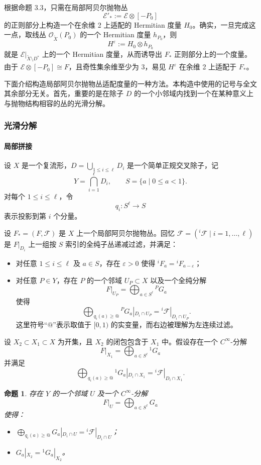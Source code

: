 \documentclass[12pt,a4paper]{article}
\newtheorem{proposition}[theorem]{命题}
\begin{document}
根据命题 3.3，只需在局部阿贝尔抛物丛
\[
\mathcal E'_*:=\mathcal E\otimes [-P_0]
\]
的正则部分上构造一个在余维 2 上适配的 Hermitian 度量 \(H_0\)。确实，一旦完成这一点，取线丛 \(\mathcal O_{\widetilde X}(P_0)\) 的一个 Hermitian 度量 \(h_{P_0}\)，则
\[
H^\varepsilon:=H_0\otimes h_{P_0}
\]
就是 \(\mathcal E|_{\widetilde X\setminus D^*}\) 上的一个 Hermitian 度量，从而诱导出 \(F_*\) 正则部分上的一个度量。由于 \(\mathcal E\otimes[-P_0]\cong F\)，且奇性集余维至少为 3，易见 \(H^\varepsilon\) 在余维 2 上适配于 \(F_*\)。

下面介绍构造局部阿贝尔抛物丛适配度量的一种方法。本构造中使用的记号与全文其余部分无关。首先，重要的是在除子 \(D\) 的一个小邻域内找到一个在某种意义上与抛物结构相容的丛的光滑分解。

\subsubsection{光滑分解}

\paragraph{局部拼接}
设 \(X\) 是一个复流形，\(D=\bigcup_{1\le i\le \ell}D_i\) 是一个简单正规交叉除子，记
\[
Y=\bigcap_{i=1}^\ell D_i,\qquad S=\{a\mid 0\le a<1\}.
\]
对每个 \(1\le i\le \ell\)，令
\[
q_i:S^\ell\to S
\]
表示投影到第 \(i\) 个分量。

设 \(F_*=(F,\mathcal F)\) 是 \(X\) 上一个局部阿贝尔抛物丛。回忆 \(\mathcal F=({}^i\mathcal F\mid i=1,\dots,\ell)\) 是 \(F|_{D_i}\) 上一组按 \(S\) 索引的全纯子丛递减过滤，并满足：
\begin{itemize}
\item 对任意 \(1\le i\le \ell\) 及 \(a\in S\)，存在 \(\varepsilon>0\) 使得 \({}^iF_a={}^iF_{a-\varepsilon}\)；
\item 对任意 \(P\in Y\)，存在 \(P\) 的一个邻域 \(U_P\subset X\) 以及一个全纯分解
\[
F|_{U_P}=\bigoplus_{a\in S^\ell} {}^P G_a
\]
使得
\[
\bigoplus_{q_i(a)\ge @} {}^P G_a|_{D_i\cap U_P}
=
{}^i\mathcal F|_{D_i\cap U_P}.
\]
这里符号“\(@\)”表示取值于 \([0,1)\) 的实变量，而右边被理解为左连续过滤。
\end{itemize}

设 \(X_2\subset X_1\subset X\) 为开集，且 \(X_2\) 的闭包包含于 \(X_1\) 中。假设存在一个 \(C^\infty\)-分解
\[
F|_{X_1}=\bigoplus_{a\in S^\ell} {}^1G_a
\]
并满足
\[
\bigoplus_{q_i(a)\ge @} {}^1G_a|_{D_i\cap X_1}
=
{}^i\mathcal F|_{D_i\cap X_1}.
\]

\begin{proposition}
存在 \(Y\) 的一个邻域 \(U\) 及一个 \(C^\infty\)-分解
\[
F|_U=\bigoplus_{a\in S^\ell} G_a
\]
使得：
\begin{itemize}
\item \(\bigoplus_{q_i(a)\ge @}G_a|_{D_i\cap U}={}^i\mathcal F|_{D_i\cap U}\)；
\item \(G_a|_{X_2}={}^1G_a|_{X_2}\)。
\end{itemize}
\end{proposition}
\end{document}
